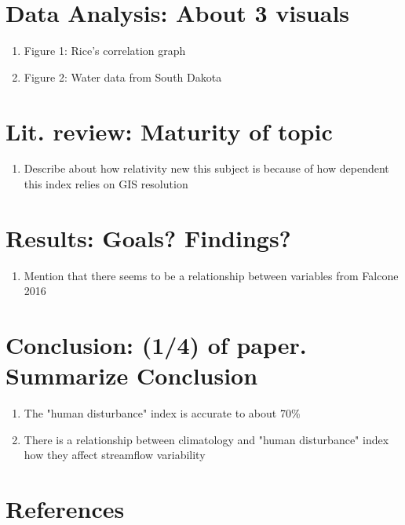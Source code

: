 \documentclass{article}
\begin{document}
\section{Data Analysis: About 3 visuals}

    \begin{enumerate}
        \item Figure 1: Rice's correlation graph
        \item Figure 2: Water data from South Dakota
    \end{enumerate}

\section{Lit. review: Maturity of topic}

    \begin{enumerate}
        \item Describe about how relativity new this subject is because of how dependent this index relies on GIS resolution
    \end{enumerate}

\section{Results: Goals? Findings?}

    \begin{enumerate}
        \item Mention that there seems to be a relationship between variables from Falcone 2016  
    \end{enumerate}

\section{Conclusion: (1/4) of paper. Summarize Conclusion}


    \begin{enumerate}
        \item The "human disturbance" index is accurate to about 70\% 
        \item There is a relationship  between climatology and "human disturbance" index how they affect streamflow variability 
    \end{enumerate}

\section{References}
\end{document}
